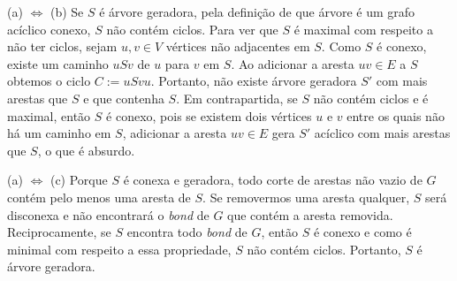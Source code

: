 (a) $\Leftrightarrow$ (b) Se $S$ é árvore geradora, pela definição de que árvore
é um grafo acíclico conexo, $S$ não contém ciclos. Para ver que $S$ é maximal com
respeito a não ter ciclos, sejam $u,v \in V$ vértices não adjacentes em $S$. Como
$S$ é conexo, existe um caminho $uSv$ de $u$ para $v$ em $S$. Ao adicionar a aresta
$uv \in E$ a $S$ obtemos o ciclo $C:= uSvu$. Portanto, não existe árvore geradora
$S'$ com mais arestas que $S$ e que contenha $S$. Em contrapartida, se $S$ não
contém ciclos e é maximal, então $S$ é conexo, pois se existem dois vértices $u$
e $v$ entre os quais não há um caminho em $S$, adicionar a aresta $uv \in E$ gera
$S'$ acíclico com mais arestas que $S$, o que é absurdo.

(a) $\Leftrightarrow$ (c) Porque $S$ é conexa e geradora, todo corte de arestas
não vazio de $G$ contém pelo menos uma aresta de $S$. Se removermos uma aresta
qualquer, $S$ será disconexa e não encontrará o \emph{bond} de $G$ que contém a
aresta removida. Reciprocamente, se $S$ encontra todo \emph{bond} de $G$, então
$S$ é conexo e como é minimal com respeito a essa propriedade, $S$ não contém
ciclos. Portanto, $S$ é árvore geradora.

